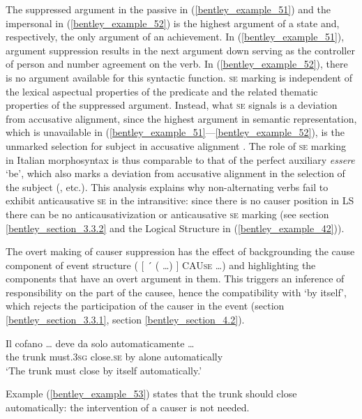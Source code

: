 \documentclass[output=paper,colorlinks,citecolor=brown
]{langscibook}
\begin{document}
The suppressed argument in the passive in (\ref{bentley_example_51}) and the impersonal in (\ref{bentley_example_52}) is the highest argument of a state and, respectively, the only argument of an achievement. In (\ref{bentley_example_51}), argument suppression results in the next argument down serving as the controller of person and number agreement on the verb. In (\ref{bentley_example_52}), there is no argument available for this syntactic function. \textsc{se} marking is independent of the lexical aspectual properties of the predicate and the related thematic properties of the suppressed argument. Instead, what \textsc{se} signals is a deviation from accusative alignment, since the highest argument in semantic representation, which is unavailable in (\ref{bentley_example_51}—\ref{bentley_example_52}), is the unmarked selection for subject in accusative alignment \citep[175]{vanvalin1997syntax}. The role of \textsc{se} marking in Italian morphosyntax is thus comparable to that of the perfect auxiliary \textit{essere} ‘be’, which also marks a deviation from accusative alignment in the selection of the subject (\cite{lafauci1988oggetti,bentley2006split,ledgeway2012latin,loporcaro2016auxiliary}, etc.). This analysis explains why non-alternating verbs fail to exhibit anticausative \textsc{se} in the intransitive: since there is no causer position in LS there can be no anticausativization or anticausative \textsc{se} marking (see section \ref{bentley_section_3.3.2} and the Logical Structure in (\ref{bentley_example_42})).

The overt making of causer suppression has the effect of backgrounding the cause component of event structure ( $\lbrack$ ´ ( \ldots ) $\rbrack$ CAU\textsc{se} \ldots ) and highlighting the components that have an overt argument in them. This triggers an inference of responsibility on the part of the causee, hence the compatibility with ‘by itself’, which rejects the participation of the causer in the event (section \ref{bentley_section_3.3.1}, section \ref{bentley_section_4.2}). 

\ea \label{bentley_example_53}
\gll Il		cofano  {\ldots} 		deve					 da		solo		automaticamente {\ldots } \\
	the	trunk	{}						must.3\textsc{sg}		close.\textsc{se}			by	alone	automatically \\
\glt ‘The trunk must close by itself automatically.’
\z

Example (\ref{bentley_example_53}) states that the trunk should close automatically: the intervention of a causer is not needed. 
\end{document}
